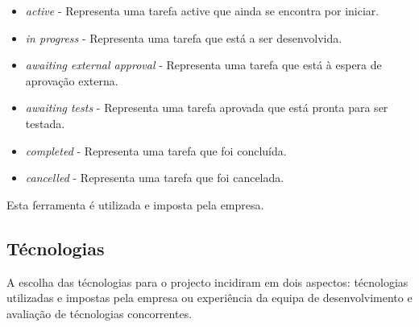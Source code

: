 \begin{itemize}
	\begin{itemize}
		\item \textit{active} - Representa uma tarefa active que ainda se encontra por iniciar.
		\item \textit{in progress} - Representa uma tarefa que está a ser desenvolvida.
		\item \textit{awaiting external approval} - Representa uma tarefa que está à espera de aprovação externa.
		\item \textit{awaiting tests} - Representa uma tarefa aprovada que está pronta para ser testada.
		\item \textit{completed} - Representa uma tarefa que foi concluída.
		\item \textit{cancelled} - Representa uma tarefa que foi cancelada.
	\end{itemize}
	 Esta ferramenta é utilizada e imposta pela empresa. 
\end{itemize}


\subsection{Técnologias}

A escolha das técnologias para o projecto incidiram em dois aspectos: técnologias utilizadas e impostas pela empresa ou experiência da equipa de desenvolvimento e avaliação de técnologias concorrentes.

